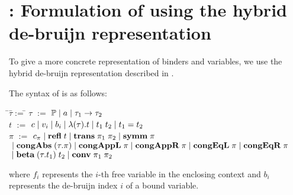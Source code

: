 \documentclass[10pt]{article}
\begin{document}
\section{\STLCD: Formulation of \STLCE using the hybrid de-bruijn representation}

To give a more concrete representation of binders and variables, we
use the hybrid de-bruijn representation described in
\cite{stampoulis12}. 

\begin{mydef}[Syntax]\label{def:stlcd-syntax}
The syntax of \STLCD is as follows:
%
\begin{tabbing}
\qquad\=$\tau$\quad\=$:=$\quad\=\kill
\>$\tau$  \>$:=$  \>$\mathbb{P} \; | \; a \; | \; \tau_1 \to \tau_2$\\
\>$t$     \>$:=$  \>$c \; | \; v_i \; | \; b_i \; | \; \lambda{(\tau)}.{t} \; | \; t_1\; t_2 \; | \; t_1 = t_2$\\
\>$\pi$   \>$:=$  \>$c_\pi \; | \; \mbox{\bf refl}\; t \; | \; \mbox{\bf trans}\;\pi_1\; \pi_2 \; | \; \mbox{\bf symm}\; \pi$\\
\>\>\>$\; | \; \mbox{\bf congAbs}\;(\tau.\pi) \; | \; \mbox{\bf congAppL}\;\pi \; | \; \mbox{\bf congAppR}\;\pi 
       \; | \; \mbox{\bf congEqL}\;\pi \; | \; \mbox{\bf congEqR}\;\pi$\\
\>\>\>$\; | \; \mbox{\bf beta}\;(\tau.t_1)\; t_2 \; | \; \mbox{\bf conv}\; \pi_1\; \pi_2$
\end{tabbing}
%
where $f_i$ represents the $i$-th free variable in the enclosing
context and $b_i$ represents the de-bruijn index $i$ of a bound
variable.
\end{mydef}
\end{document}
